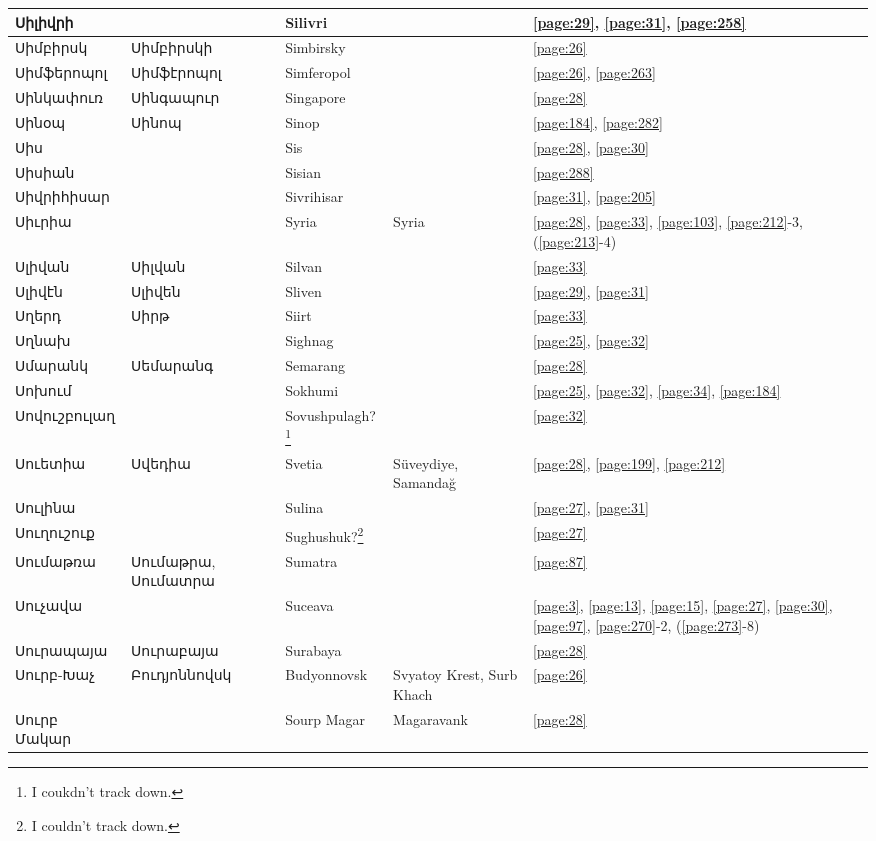 \begin{center}
\begin{longtable}{|p{}|p{3cm}|p{3cm}|p{2cm}|p{3cm}|}
Սիլիվրի& & Silivri& &\ref{page:29}, \ref{page:31}, \ref{page:258}\\ \hline
Սիմբիրսկ&Սիմբիրսկի &Simbirsky & &\ref{page:26}\\ \hline
Սիմֆերոպոլ& Սիմֆէրոպոլ&Simferopol & &\ref{page:26}, \ref{page:263}\\ \hline
Սինկափուռ&Սինգապուր & Singapore& &\ref{page:28}\\ \hline
Սինօպ& Սինոպ&Sinop & &\ref{page:184}, \ref{page:282}\\ \hline
Սիս& &Sis & &\ref{page:28}, \ref{page:30}\\ \hline
Սիսիան& &Sisian & &\ref{page:288}\\ \hline
Սիվրիհիսար& & Sivrihisar& &\ref{page:31}, \ref{page:205}\\ \hline
Սիւրիա& &Syria &Syria &\ref{page:28}, \ref{page:33}, \ref{page:103}, \ref{page:212}-3, (\ref{page:213}-4)\\ \hline
Սլիվան& Սիլվան&Silvan & &\ref{page:33}\\ \hline
Սլիվէն&   Սլիվեն &Sliven & &\ref{page:29}, \ref{page:31}\\ \hline
Սղերդ& Սիրթ& Siirt& &\ref{page:33}\\ \hline
Սղնախ& & Sighnag& &\ref{page:25}, \ref{page:32}\\ \hline
Սմարանկ& Սեմարանգ& Semarang& &\ref{page:28}\\ \hline
Սոխում& & Sokhumi& &\ref{page:25}, \ref{page:32}, \ref{page:34}, \ref{page:184}\\ \hline
Սովուշբուլաղ& &Sovushpulagh?\footnote{I coukdn't track down.} & &\ref{page:32}\\ \hline
Սուետիա& Սվեդիա& Svetia  &Süveydiye, Samandağ&\ref{page:28}, \ref{page:199}, \ref{page:212}\\ \hline
Սուլինա& & Sulina& &\ref{page:27}, \ref{page:31}\\ \hline
Սուղուշուք& &Sughushuk?\footnote{I couldn't track down.} & &\ref{page:27}\\ \hline
Սումաթռա& Սումաթրա, Սումատրա & Sumatra   & &\ref{page:87}\\ \hline
Սուչավա& &
Suceava& &\ref{page:3}, \ref{page:13}, \ref{page:15}, \ref{page:27}, \ref{page:30}, \ref{page:97}, \ref{page:270}-2, (\ref{page:273}-8)\\ \hline
Սուրապայա&Սուրաբայա &Surabaya & &\ref{page:28}\\ \hline
Սուրբ-Խաչ& Բուդյոննովսկ& Budyonnovsk&Svyatoy Krest, Surb Khach &\ref{page:26}\\ \hline
Սուրբ Մակար& & Sourp Magar&Magaravank &\ref{page:28}\\ \hline

\end{longtable}
\end{center}
